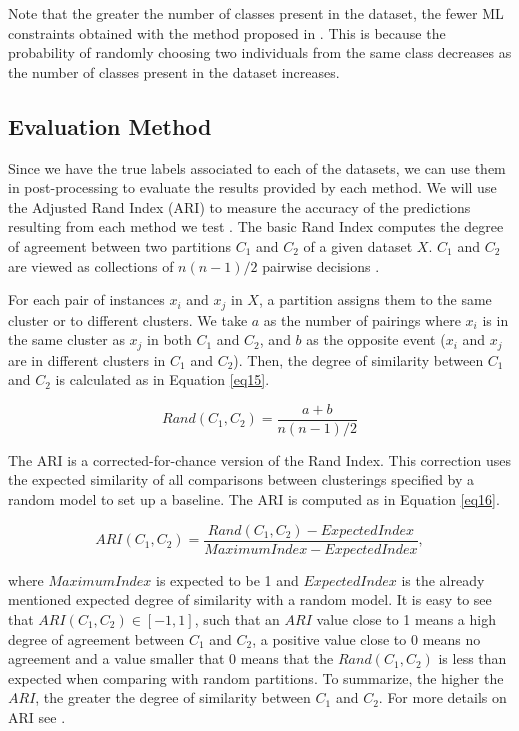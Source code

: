 \documentclass[review]{elsarticle}
\begin{document}
Note that the greater the number of classes present in the dataset, the fewer ML constraints obtained with the method proposed in \cite{wagstaff2001constrained}. This is because the probability of randomly choosing two individuals from the same class decreases as the number of classes present in the dataset increases.

\clearpage

\subsection{Evaluation Method} \label{sec:EvalMet}

Since we have the true labels associated to each of the datasets, we can use them in post-processing to evaluate the results provided by each method. We will use the Adjusted Rand Index (ARI) to measure the accuracy of the predictions resulting from each method we test \cite{hubert1985comparing}. The basic Rand Index computes the degree of agreement between two partitions $C_1$ and $C_2$ of a given dataset $X$. $C_1$ and $C_2$ are viewed as collections of $n(n - 1)/2$ pairwise decisions \cite{rand1971objective}.

For each pair of instances $x_i$ and $x_j$ in $X$, a partition assigns them to the same cluster or to different clusters. We take $a$ as the number of pairings where $x_i$ is in the same cluster as $x_j$ in both $C_1$ and $C_2$, and $b$ as the opposite event ($x_i$ and $x_j$ are in different clusters in $C_1$ and $C_2$). Then, the degree of similarity between $C_1$ and $C_2$ is calculated as in Equation \eqref{eq15}.

\begin{equation}
Rand(C_1, C_2) = \frac{a + b}{n(n - 1)/2}
\label{eq15}
\end{equation}

The ARI is a corrected-for-chance version of the Rand Index. This correction uses the expected similarity of all comparisons between clusterings specified by a random model to set up a baseline. The ARI is computed as in Equation \eqref{eq16}.

\begin{equation}
ARI(C_1, C_2) = \frac{Rand(C_1, C_2) - ExpectedIndex}{MaximumIndex - ExpectedIndex},
\label{eq16}
\end{equation}

\noindent where $MaximumIndex$ is expected to be 1 and $ExpectedIndex$ is the already mentioned expected degree of similarity with a random model. It is easy to see that $ARI(C_1, C_2) \in [-1,1]$, such that an $ARI$ value close to 1 means a high degree of agreement between $C_1$ and $C_2$, a positive value close to 0 means no agreement and a value smaller that 0 means that the $Rand(C_1, C_2)$ is less than expected when comparing with random partitions. To summarize, the higher the $ARI$, the greater the degree of similarity between $C_1$ and $C_2$. For more details on ARI see \cite{hubert1985comparing}.
\end{document}
